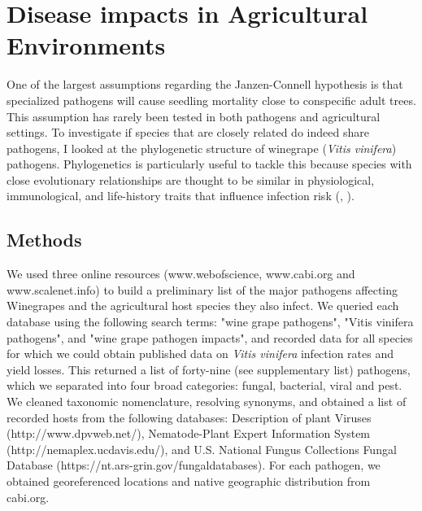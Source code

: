 \documentclass{article}
\begin{document}
\section{Disease impacts in Agricultural Environments}
One of the largest assumptions regarding the Janzen-Connell hypothesis is that specialized pathogens will cause seedling mortality close to conspecific adult trees. This assumption has rarely been tested in both pathogens and agricultural settings. To investigate if species that are closely related do indeed share pathogens, I looked at the phylogenetic structure of winegrape (\textit{Vitis vinifera}) pathogens. Phylogenetics is particularly useful to tackle this because species with close evolutionary relationships are thought to be similar in physiological, immunological, and life-history traits that influence infection risk (\citep{Davies2008}, \citep{Gilbert2007}). 

\subsection{Methods}
We used three online resources (www.webofscience, www.cabi.org and www.scalenet.info) to build a preliminary list of the major pathogens affecting Winegrapes and the agricultural host species they also infect. We queried each database using the following search terms: "wine grape pathogens", "Vitis vinifera pathogens", and "wine grape pathogen impacts", and recorded data for all species for which we could obtain published data on \textit{Vitis vinifera} infection rates and yield losses. This returned a list of forty-nine (see supplementary list) pathogens, which we separated into four broad categories: fungal, bacterial, viral and pest. We cleaned taxonomic nomenclature, resolving synonyms, and obtained a list of recorded hosts from the following databases: Description of plant Viruses (http://www.dpvweb.net/), Nematode-Plant Expert Information System (http://nemaplex.ucdavis.edu/), and  U.S. National Fungus Collections Fungal Database (https://nt.ars-grin.gov/fungaldatabases). For each pathogen, we obtained georeferenced locations and native geographic distribution from cabi.org.
\end{document}
